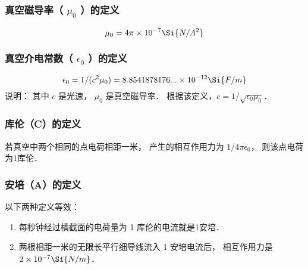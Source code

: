 \subsubsection{真空磁导率（ ${\mu _0}$ ）的定义}
  \begin{equation}
{\mu _0} = 4\pi  \times {10^{ - 7}}\Si{N/A^2}
\end{equation}

\subsubsection{真空介电常数（ ${\epsilon _0}$ ）的定义}
   \begin{equation}
{\epsilon _0} = 1/({c^2}{\mu _0}) = 8.8541878176... \times {10^{ - 12}}\Si{F/m}
\end{equation}
说明： 其中 $c$ 是光速， ${\mu _0}$ 是真空磁导率． 根据该定义，$c = 1/\sqrt {{\epsilon _0}{\mu _0}} $．  

\subsubsection{库伦（C）的定义}
若真空中两个相同的点电荷相距一米， 产生的相互作用力为 ${1}/{{4\pi {\epsilon _0}}}$，   则该点电荷为1库伦．

\subsubsection{安培（A）的定义}
以下两种定义等效：
\begin{enumerate}
\item 每秒钟经过横截面的电荷量为 1 库伦的电流就是1安培．
\item 两根相距一米的无限长平行细导线流入 1 安培电流后， 相互作用力是 $2 \times {10^{ - 7}}\Si{N/m}$． 
\end{enumerate}



